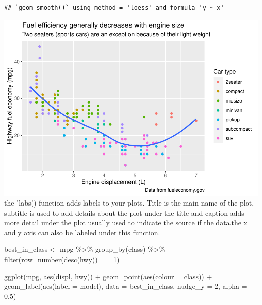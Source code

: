\documentclass[
]{article}
\newenvironment{Shaded}{\begin{snugshade}}{\end{snugshade}}
\newcommand{\AttributeTok}[1]{\textcolor[rgb]{0.77,0.63,0.00}{#1}}
\newcommand{\DecValTok}[1]{\textcolor[rgb]{0.00,0.00,0.81}{#1}}
\newcommand{\FloatTok}[1]{\textcolor[rgb]{0.00,0.00,0.81}{#1}}
\newcommand{\FunctionTok}[1]{\textcolor[rgb]{0.00,0.00,0.00}{#1}}
\newcommand{\NormalTok}[1]{#1}
\newcommand{\OtherTok}[1]{\textcolor[rgb]{0.56,0.35,0.01}{#1}}
\newcommand{\SpecialCharTok}[1]{\textcolor[rgb]{0.00,0.00,0.00}{#1}}
\begin{document}
\begin{verbatim}
## `geom_smooth()` using method = 'loess' and formula 'y ~ x'
\end{verbatim}

\includegraphics{Assignments_files/figure-latex/unnamed-chunk-57-1.pdf}
the "labs() function adds labels to your plots. Title is the main name
of the plot, subtitle is used to add details about the plot under the
title and caption adds more detail under the plot usually used to
indicate the source if the data.the x and y axis can also be labeled
under this function.

\begin{Shaded}
\begin{Highlighting}[]
\NormalTok{best\_in\_class }\OtherTok{\textless{}{-}}\NormalTok{ mpg }\SpecialCharTok{\%\textgreater{}\%}
  \FunctionTok{group\_by}\NormalTok{(class) }\SpecialCharTok{\%\textgreater{}\%}
  \FunctionTok{filter}\NormalTok{(}\FunctionTok{row\_number}\NormalTok{(}\FunctionTok{desc}\NormalTok{(hwy)) }\SpecialCharTok{==} \DecValTok{1}\NormalTok{)}

\FunctionTok{ggplot}\NormalTok{(mpg, }\FunctionTok{aes}\NormalTok{(displ, hwy)) }\SpecialCharTok{+}
  \FunctionTok{geom\_point}\NormalTok{(}\FunctionTok{aes}\NormalTok{(}\AttributeTok{colour =}\NormalTok{ class)) }\SpecialCharTok{+}
  \FunctionTok{geom\_label}\NormalTok{(}\FunctionTok{aes}\NormalTok{(}\AttributeTok{label =}\NormalTok{ model), }\AttributeTok{data =}\NormalTok{ best\_in\_class, }\AttributeTok{nudge\_y =} \DecValTok{2}\NormalTok{, }\AttributeTok{alpha =} \FloatTok{0.5}\NormalTok{)}
\end{Highlighting}
\end{Shaded}
\end{document}
